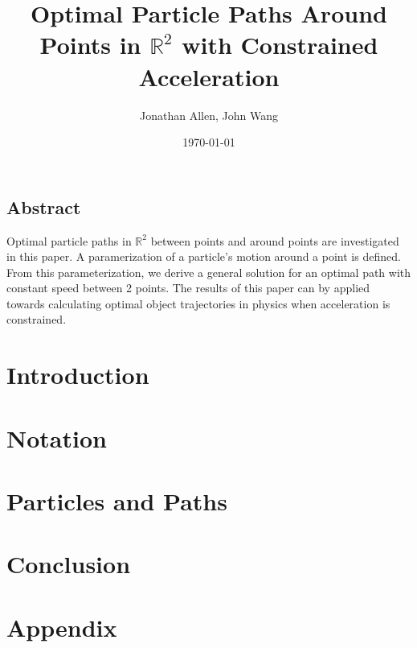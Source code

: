 \documentclass[12pt]{amsart}   %
\newcommand{\R}{\mathbb R}
\begin{document}
\graphicspath{ {figures/} }

\title[Optimal Paths in R2]{Optimal Particle Paths Around Points in $\R^2$ with Constrained Acceleration} 
 
\author{Jonathan Allen, John Wang}
\date{\today}

\maketitle

\subsection*{Abstract}

Optimal particle paths in $\R^2$ between points and around points are investigated in this paper. A paramerization of a particle's motion around a point is defined. From this parameterization, we derive a general solution for an optimal path with constant speed between 2 points. The results of this paper can by applied towards calculating optimal object trajectories in physics when acceleration is constrained. 

\section{Introduction}


\section{Notation}


\section{Particles and Paths}


% 

\section{Conclusion}


\section*{Appendix}



\end{document}

